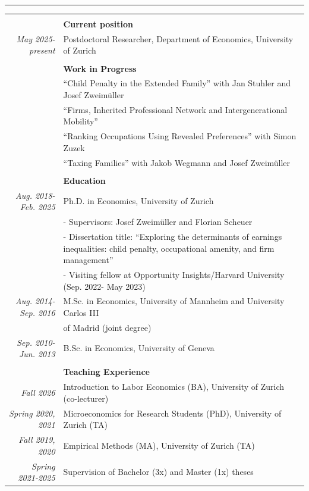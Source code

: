 \documentclass[a4,11pt,oneside]{article}
\newcommand{\headercv}[1]{ & \\[1pt] & \large \textbf{#1}   \\[1pt]	}
\begin{document}
\hrule
\vspace{-2pt}
\renewcommand{\arraystretch}{1.1}
\noindent \begin{tabular}{@{} >{\em \small}r  @{\hskip 5pt} p{12.5cm}}
\vspace{10pt}
\headercv{Current position} 	
May 2025-present   & Postdoctoral Researcher, Department of Economics, University of Zurich  \\

\headercv{Work in Progress}	
&  ``Child Penalty in the Extended Family'' with Jan Stuhler and Josef Zweimüller  \\	
   &  ``Firms, Inherited Professional Network and Intergenerational Mobility''  \\	
   &  ``Ranking Occupations Using Revealed Preferences''  with Simon Zuzek \\
     &  ``Taxing Families''  with Jakob Wegmann and Josef Zweimüller \\ 

\headercv{Education} 	
Aug. 2018-Feb. 2025   & Ph.D. in Economics, University of Zurich  \\
    & \quad  - Supervisors: Josef Zweim\"{u}ller and Florian Scheuer \\
        & \quad - Dissertation title: ``Exploring the determinants of earnings inequalities: child penalty, occupational amenity, and firm management'' \\
    & \quad - Visiting fellow at Opportunity Insights/Harvard University (Sep. 2022- May 2023)  \\
    
Aug. 2014-Sep. 2016  & M.Sc. in Economics,  University of Mannheim  and University Carlos III \\
 & of Madrid (joint degree)    \\
    
Sep. 2010-Jun. 2013  & B.Sc. in Economics, University of Geneva  \\
   

	
\headercv{Teaching Experience}	
Fall 2026 & Introduction to Labor Economics (BA), University of Zurich (co-lecturer) \\
Spring 2020, 2021 & Microeconomics for Research Students (PhD), University of Zurich (TA) \\
Fall 2019, 2020    & Empirical Methods (MA), University of Zurich (TA) \\
Spring 2021-2025 & Supervision of Bachelor (3x) and Master (1x) theses \\



\end{tabular}
\end{document}
